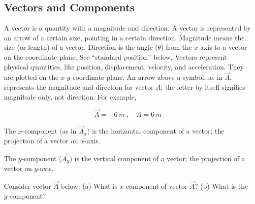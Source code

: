 \documentclass{article}
\begin{document}
\subsection{Vectors and Components}

A vector is a quantity with a magnitude and direction. A vector is represented by an arrow of a certain size, pointing in a certain direction. Magnitude means the size (or length) of a vector. Direction is the angle ($\theta$) from the $x$-axis to a vector on the coordinate plane. See ``standard position'' below. Vectors represent physical quantities, like position, displacement, velocity, and acceleration. They are plotted on the $x$-$y$ coordinate plane. An arrow above a symbol, as in $\vec{A}$, represents the magnitude and direction for vector $A$; the letter by itself signifies magnitude only, not direction. For example,

\begin{equation*}
    \vec{A} = \SI{-6}{m}\ , \hspace{1em} A = \SI{6}{m}
\end{equation*}


The $x$-component (as in  $\vec{A}_x$) is the horizontal component of a vector; the projection of a vector on $x$-axis.


The $y$-component ($\vec{A}_y$) is the vertical component of a vector; the projection of a vector on $y$-axis.

\begin{example}
Consider vector $\vec{A}$ below. (a) What is $x$-component of vector $\vec{A}$? (b) What is the $y$-component?
\end{example}
\end{document}
